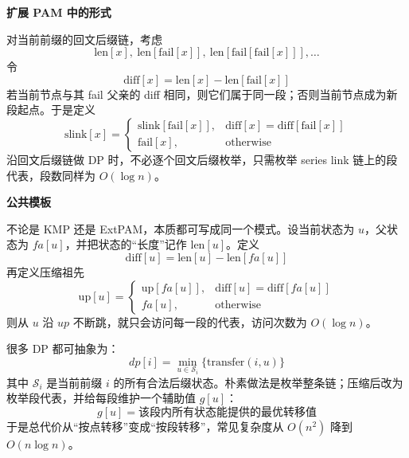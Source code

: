 \textbf{扩展 PAM 中的形式}

对当前前缀的回文后缀链，考虑
\[
\text{len}[x],\ \text{len}[\text{fail}[x]],\ \text{len}[\text{fail}[\text{fail}[x]]],\dots
\]
令
\[
\text{diff}[x] = \text{len}[x] - \text{len}[\text{fail}[x]]
\]
若当前节点与其 fail 父亲的 diff 相同，则它们属于同一段；否则当前节点成为新段起点。于是定义
\[
\text{slink}[x] =
\begin{cases}
\text{slink}[\text{fail}[x]], & \text{diff}[x] = \text{diff}[\text{fail}[x]] \\
\text{fail}[x], & \text{otherwise}
\end{cases}
\]
沿回文后缀链做 DP 时，不必逐个回文后缀枚举，只需枚举 series link 链上的段代表，段数同样为 $O(\log n)$。

\textbf{公共模板}

不论是 KMP 还是 ExtPAM，本质都可写成同一个模式。设当前状态为 $u$，父状态为 $fa[u]$，并把状态的“长度”记作 $\text{len}[u]$。定义
\[
\text{diff}[u] = \text{len}[u] - \text{len}[fa[u]]
\]
再定义压缩祖先
\[
\text{up}[u] =
\begin{cases}
\text{up}[fa[u]], & \text{diff}[u] = \text{diff}[fa[u]] \\
fa[u], & \text{otherwise}
\end{cases}
\]
则从 $u$ 沿 $up$ 不断跳，就只会访问每一段的代表，访问次数为 $O(\log n)$。

很多 DP 都可抽象为：
\[
dp[i] = \min_{u \in \mathcal{S}_i} \{ \text{transfer}(i, u) \}
\]
其中 $\mathcal{S}_i$ 是当前前缀 $i$ 的所有合法后缀状态。朴素做法是枚举整条链；压缩后改为枚举段代表，并给每段维护一个辅助值 $g[u]$：
\[
g[u] = \text{该段内所有状态能提供的最优转移值}
\]
于是总代价从“按点转移”变成“按段转移”，常见复杂度从 $O(n^2)$ 降到 $O(n \log n)$。
